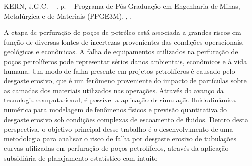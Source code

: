 \documentclass[
	12pt,				%
	openright,			%
	oneside,			%
	a4paper,			%
	english,			%
	french,				%
	spanish,			%
	brazil				%
	]{abntex2}
\begin{document}
\setlength{\absparsep}{18pt} %
\begin{resumo}

\SingleSpacing KERN, J.G.C. ~{\bfseries \rmfamily \fontsize{12}{12} \imprimirtitulo} \imprimirdata. \thelastpage p. \imprimirtipotrabalho – Programa de Pós-Graduação em Engenharia de Minas, Metalúrgica e de Materiais (PPGE3M), \imprimirinstituicao, \imprimirlocal.

A etapa de perfuração de poços de petróleo está associada a grandes riscos em função de diversas fontes de incertezas provenientes das condições operacionais, geológicas e econômicas. A falha de equipamentos utilizados na perfuração de poços petrolíferos pode representar sérios danos ambientais, econômicos e à vida humana. Um modo de falha presente em projetos petrolíferos é causado pelo desgaste erosivo, que é um fenômeno proveniente do impacto de partículas sobre as camadas dos materiais utilizados nas operações. Através do avanço da tecnologia computacional, é possível a aplicação de simulação fluidodinâmica numérica para modelagem de fenômenos físicos e previsão quantitativa do desgaste erosivo sob condições complexas de escoamento de fluidos. Dentro desta perspectiva, o objetivo principal desse trabalho é o desenvolvimento de uma metodologia para
analisar o risco de falha por desgaste erosivo de tubulações curvas utilizadas em perfuração de
poços petrolíferos, através da aplicação subsidiária de planejamento estatístico com intuito

\end{resumo}
\end{document}
